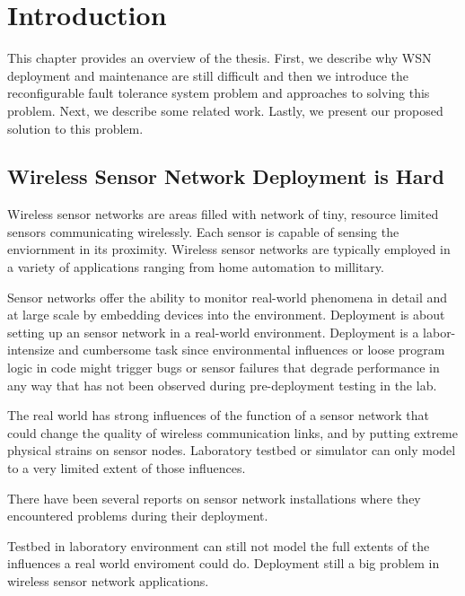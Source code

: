 \cleardoublepage
\singlespacing
\chapter{Introduction}
\label{c:intro}
\doublespacing\nointerlineskip

This chapter provides an overview of the thesis. First, we describe why
WSN deployment and maintenance are still difficult and then we introduce the
reconfigurable fault tolerance system problem and approaches to solving this
problem. Next, we describe some related work. Lastly, we present our proposed
solution to this problem.

\section{Wireless Sensor Network Deployment is Hard}

Wireless sensor networks are areas filled with network of tiny, resource
limited sensors communicating wirelessly. Each sensor is capable of sensing the
enviornment in its proximity. Wireless sensor networks are typically employed in
a variety of applications ranging from home automation to millitary.

Sensor networks offer the ability to monitor real-world phenomena in detail and
at large scale by embedding devices into the environment. Deployment is
about setting up an sensor network in a real-world environment. Deployment is
a labor-intensize and cumbersome task since environmental influences or
loose program logic in code might trigger bugs or sensor failures that
degrade performance in any way that has not been observed during pre-deployment
testing in the lab.

The real world has strong influences of the function of a sensor network that
could change the quality of wireless communication links, and by putting
extreme physical strains on sensor nodes. Laboratory testbed or simulator can 
only model to a very limited extent of those influences.

There have been several reports on sensor network installations where they
encountered problems during their
deployment\cite{Barrenetxea2008}\cite{Polastre2004}\cite{Arora2004}\cite{Tateson2005}\cite{Padhy2005}\cite{Stoianov2007}\cite{Tolle2005}\cite{Werner-Allen2006a}.

Testbed in laboratory environment can still not model the full extents of the
influences a real world enviroment could do. Deployment still a big problem in
wireless sensor network applications.

